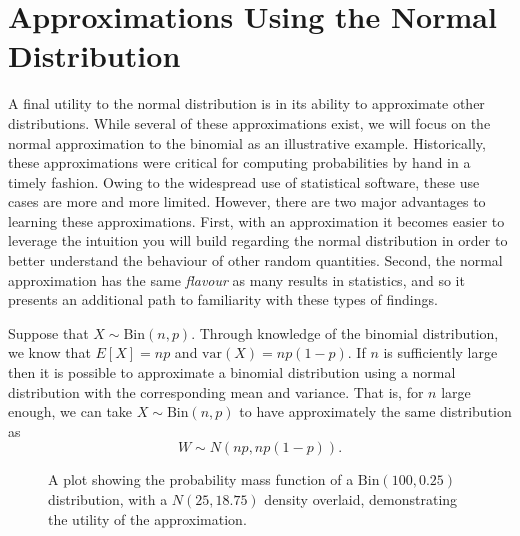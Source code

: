 \documentclass[
  letterpaper,
  DIV=11,
  numbers=noendperiod]{scrreprt}
\theoremstyle{definition}
\theoremstyle{definition}
\theoremstyle{definition}
\theoremstyle{remark}
\begin{document}
\section{Approximations Using the Normal
Distribution}\label{approximations-using-the-normal-distribution}

A final utility to the normal distribution is in its ability to
approximate other distributions. While several of these approximations
exist, we will focus on the normal approximation to the binomial as an
illustrative example. Historically, these approximations were critical
for computing probabilities by hand in a timely fashion. Owing to the
widespread use of statistical software, these use cases are more and
more limited. However, there are two major advantages to learning these
approximations. First, with an approximation it becomes easier to
leverage the intuition you will build regarding the normal distribution
in order to better understand the behaviour of other random quantities.
Second, the normal approximation has the same \emph{flavour} as many
results in statistics, and so it presents an additional path to
familiarity with these types of findings.

Suppose that \(X\sim\text{Bin}(n,p)\). Through knowledge of the binomial
distribution, we know that \(E[X] = np\) and
\(\text{var}(X) = np(1-p)\). If \(n\) is sufficiently large then it is
possible to approximate a binomial distribution using a normal
distribution with the corresponding mean and variance. That is, for
\(n\) large enough, we can take \(X\sim\text{Bin}(n,p)\) to have
approximately the same distribution as \[W\sim N(np, np(1-p)).\]

\begin{figure}[H]

\caption{\label{fig-normal-approximation}A plot showing the probability
mass function of a \(\text{Bin}(100, 0.25)\) distribution, with a
\(N(25, 18.75)\) density overlaid, demonstrating the utility of the
approximation.}


\end{figure}%
\end{document}

